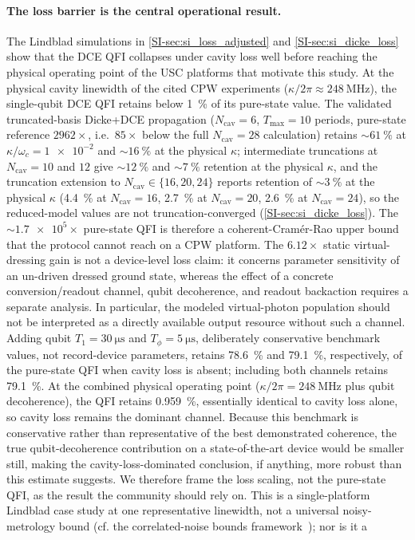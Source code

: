 \documentclass[aps,prxquantum,preprint,superscriptaddress,amsmath,amssymb]{revtex4-2}
\begin{document}
\paragraph{The loss barrier is the central operational result.}
The Lindblad simulations in \cref{SI-sec:si_loss_adjusted} and \cref{SI-sec:si_dicke_loss} show that the DCE QFI collapses under cavity loss well before reaching the physical operating point of the USC platforms that motivate this study. At the physical cavity linewidth of the cited CPW experiments ($\kappa/2\pi \approx \qty{248}{\mega\hertz}$), the single-qubit DCE QFI retains below \qty{1}{\percent} of its pure-state value. The validated truncated-basis Dicke+DCE propagation ($N_{\text{cav}}=\num{6}$, $T_{\text{max}}=\num{10}$ periods, pure-state reference $\num{2962}\times$, i.e.\ $\num{85}\times$ below the full $N_{\text{cav}}=\num{28}$ calculation) retains $\sim\!\qty{61}{\percent}$ at $\kappa/\omega_c=\num{1e-2}$ and $\sim\!\qty{16}{\percent}$ at the physical $\kappa$; intermediate truncations at $N_{\text{cav}}=\num{10}$ and $\num{12}$ give $\sim\!\qty{12}{\percent}$ and $\sim\!\qty{7}{\percent}$ retention at the physical $\kappa$, and the truncation extension to $N_{\text{cav}}\in\{\num{16},\num{20},\num{24}\}$ reports retention of $\sim\!\qty{3}{\percent}$ at the physical $\kappa$ (\qty{4.4}{\percent} at $N_{\text{cav}}=\num{16}$, \qty{2.7}{\percent} at $N_{\text{cav}}=\num{20}$, \qty{2.6}{\percent} at $N_{\text{cav}}=\num{24}$), so the reduced-model values are not truncation-converged (\cref{SI-sec:si_dicke_loss}). The $\sim\num{1.7e5}\times$ pure-state QFI is therefore a coherent-Cram\'er-Rao upper bound that the protocol cannot reach on a CPW platform. The $\num{6.12}\times$ static virtual-dressing gain is not a device-level loss claim: it concerns parameter sensitivity of an un-driven dressed ground state, whereas the effect of a concrete conversion/readout channel, qubit decoherence, and readout backaction requires a separate analysis. In particular, the modeled virtual-photon population should not be interpreted as a directly available output resource without such a channel. Adding qubit $T_1=\qty{30}{\micro\second}$ and $T_\phi=\qty{5}{\micro\second}$, deliberately conservative benchmark values, not record-device parameters, retains \qty{78.6}{\percent} and \qty{79.1}{\percent}, respectively, of the pure-state QFI when cavity loss is absent; including both channels retains \qty{79.1}{\percent}. At the combined physical operating point ($\kappa/2\pi=\qty{248}{\mega\hertz}$ plus qubit decoherence), the QFI retains \qty{0.959}{\percent}, essentially identical to cavity loss alone, so cavity loss remains the dominant channel. Because this benchmark is conservative rather than representative of the best demonstrated coherence, the true qubit-decoherence contribution on a state-of-the-art device would be smaller still, making the cavity-loss-dominated conclusion, if anything, more robust than this estimate suggests. We therefore frame the loss scaling, not the pure-state QFI, as the result the community should rely on. This is a single-platform Lindblad case study at one representative linewidth, not a universal noisy-metrology bound (cf. the correlated-noise bounds framework~\cite{Kurdzialek2025}); nor is it a 
\end{document}
